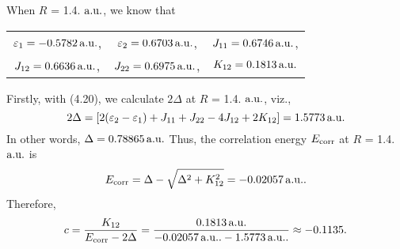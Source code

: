 \documentclass[a4paper]{book}
\newcommand{\corr}{{\rm corr}}
\newcommand{\au}{{\rm a.u.}}
\begin{document}
	\begin{solution}
	
	When $R$ = 1.4. $\au$, we know that
	\begin{center}
	\begin{tabular}{ccc}
		$\varepsilon_1 = -0.5782\,\au$, & $\varepsilon_2 = 0.6703\, \au$, & $J_{11} = 0.6746\,\au$, \\
		$J_{12} = 0.6636\,\au$, & $J_{22} = 0.6975\,\au$, & $K_{12} = 0.1813\,\au$
	\end{tabular}
	\end{center}
	
	Firstly, with (4.20), we calculate $2\Delta$ at $R$ = 1.4. $\au$, viz.,
	\[
		2\Delta = \left[ 2( \varepsilon_2 - \varepsilon_1 ) + J_{11} + J_{22} - 4J_{12} + 2K_{12} \right] = 1.5773 \, \au
	\]
	In other words, $\Delta = 0.78865 \, \au$ Thus, the correlation energy $E_\corr$ at $R$ = 1.4. $\au$ is
	\[
		E_\corr = \Delta - \sqrt{ \Delta^2 + K^2_{12} } = -0.02057 \, \au.
	\]
	Therefore,
	\begin{equation}
		c = \frac{ K_{12} }{ E_\corr - 2\Delta } =  \frac{ 0.1813 \, \au }{ -0.02057 \, \au. - 1.5773 \, \au. }  \approx - 0.1135.
	\end{equation}
	

\end{solution}
\end{document}
